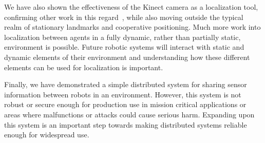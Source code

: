 \documentclass[thesis.tex]{subfile}
\begin{document}
We have also shown the effectiveness of the Kinect camera as a localization tool, confirming other work in this regard~\cite{ganganath2012mobile, biswas2012depth, cunha2011using}, while also moving outside the typical realm of stationary landmarks and cooperative positioning. Much more work into localization between agents in a fully dynamic, rather than partially static, environment is possible. Future robotic systems will interact with static and dynamic elements of their environment and understanding how these different elements can be used for localization is important.

Finally, we have demonstrated a simple distributed system for sharing sensor information between robots in an environment. However, this system is not robust or secure enough for production use in mission critical applications or areas where malfunctions or attacks could cause serious harm. Expanding upon this system is an important step towards making distributed systems reliable enough for widespread use.

\end{document}
